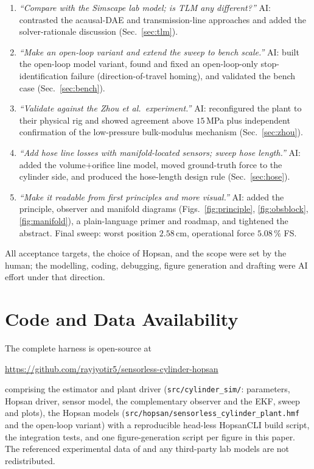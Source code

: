 \begin{enumerate}
{it.''} AI: derived the state-space model and EKF recursion (App.~\ref{app:ekf}),
implemented a non-dimensionalised, semi-implicit filter, and benchmarked it
head-to-head against the observer (Sec.~\ref{sec:ekf}).
\item \emph{``Compare with the Simscape lab model; is TLM any different?''} AI:
contrasted the acausal-DAE and transmission-line approaches and added the
solver-rationale discussion (Sec.~\ref{sec:tlm}).
\item \emph{``Make an open-loop variant and extend the sweep to bench scale.''}
AI: built the open-loop model variant, found and fixed an open-loop-only
stop-identification failure (direction-of-travel homing), and validated the bench
case (Sec.~\ref{sec:bench}).
\item \emph{``Validate against the Zhou et al.\ experiment.''} AI: reconfigured
the plant to their physical rig and showed agreement above $15$\,MPa plus
independent confirmation of the low-pressure bulk-modulus mechanism
(Sec.~\ref{sec:zhou}).
\item \emph{``Add hose line losses with manifold-located sensors; sweep hose
length.''} AI: added the volume$+$orifice line model, moved ground-truth force to
the cylinder side, and produced the hose-length design rule (Sec.~\ref{sec:hose}).
\item \emph{``Make it readable from first principles and more visual.''} AI:
added the principle, observer and manifold diagrams (Figs.~\ref{fig:principle},
\ref{fig:obsblock}, \ref{fig:manifold}), a plain-language primer and roadmap, and
tightened the abstract. Final sweep: worst position $2.58$\,cm, operational force
$5.08\,\%$ FS.
\end{enumerate}
All acceptance targets, the choice of Hopsan, and the scope were set by the human;
the modelling, coding, debugging, figure generation and drafting were AI effort
under that direction.

\section{Code and Data Availability}\label{app:code}
The complete harness is open-source at
\begin{center}
\url{https://github.com/rayjyotir5/sensorless-cylinder-hopsan}
\end{center}
comprising the estimator and plant driver
(\texttt{src/cylinder\_sim/}: parameters, Hopsan driver, sensor model, the
complementary observer and the EKF, sweep and plots), the Hopsan models
(\texttt{src/hopsan/sensorless\_cylinder\_plant.hmf} and the open-loop variant)
with a reproducible head-less HopsanCLI build script, the integration tests, and
one figure-generation script per figure in this paper. The referenced
experimental data of \cite{zhou2022pressure} and any third-party lab models are
not redistributed.
